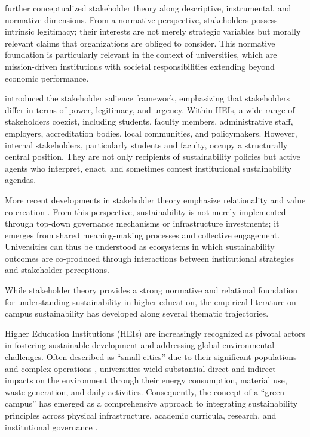 \documentclass[12pt,a4paper]{article}
\begin{document}
\citet{DonaldsonPreston1995} further conceptualized stakeholder theory along descriptive, instrumental, and normative dimensions. From a normative perspective, stakeholders possess intrinsic legitimacy; their interests are not merely strategic variables but morally relevant claims that organizations are obliged to consider. This normative foundation is particularly relevant in the context of universities, which are mission-driven institutions with societal responsibilities extending beyond economic performance.

\citet{Mitchell1997} introduced the stakeholder salience framework, emphasizing that stakeholders differ in terms of power, legitimacy, and urgency. Within HEIs, a wide range of stakeholders coexist, including students, faculty members, administrative staff, employers, accreditation bodies, local communities, and policymakers. However, internal stakeholders, particularly students and faculty, occupy a structurally central position. They are not only recipients of sustainability policies but active agents who interpret, enact, and sometimes contest institutional sustainability agendas.

More recent developments in stakeholder theory emphasize relationality and value co-creation \citep{Freeman2010}. From this perspective, sustainability is not merely implemented through top-down governance mechanisms or infrastructure investments; it emerges from shared meaning-making processes and collective engagement. Universities can thus be understood as ecosystems in which sustainability outcomes are co-produced through interactions between institutional strategies and stakeholder perceptions.

While stakeholder theory provides a strong normative and relational foundation for understanding sustainability in higher education, the empirical literature on campus sustainability has developed along several thematic trajectories.

Higher Education Institutions (HEIs) are increasingly recognized as pivotal actors in fostering sustainable development and addressing global environmental challenges. Often described as ``small cities'' due to their significant populations and complex operations \citep{Alshuwaikhat2008, Velazquez2006, MinAllah2020, Murshed2020}, universities wield substantial direct and indirect impacts on the environment through their energy consumption, material use, waste generation, and daily activities. Consequently, the concept of a ``green campus'' has emerged as a comprehensive approach to integrating sustainability principles across physical infrastructure, academic curricula, research, and institutional governance \citep{Disterheft2013, Sugiarto2022}.
\end{document}
